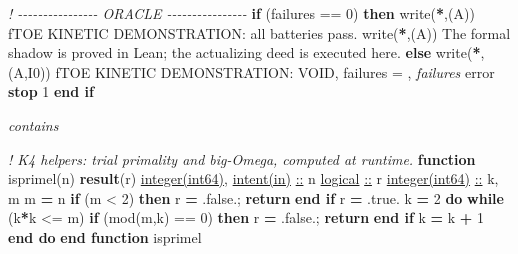 \documentclass[10pt]{article}
\renewcommand{\_}{\origunderscore\allowbreak}
\newenvironment{Shaded}{}{}
\newcommand{\BuiltInTok}[1]{#1}
\newcommand{\CommentTok}[1]{\textit{#1}}
\newcommand{\ConstantTok}[1]{#1}
\newcommand{\DataTypeTok}[1]{\underline{#1}}
\newcommand{\DecValTok}[1]{#1}
\newcommand{\KeywordTok}[1]{\textbf{#1}}
\newcommand{\NormalTok}[1]{#1}
\newcommand{\OperatorTok}[1]{#1}
\newcommand{\StringTok}[1]{#1}
\begin{document}
\begin{Shaded}
\begin{Highlighting}[]
  \CommentTok{! {-}{-}{-}{-}{-}{-}{-}{-}{-}{-}{-}{-}{-}{-}{-}{-} ORACLE {-}{-}{-}{-}{-}{-}{-}{-}{-}{-}{-}{-}{-}{-}{-}{-}}
  \KeywordTok{if}\NormalTok{ (failures }\OperatorTok{==} \DecValTok{0}\NormalTok{) }\KeywordTok{then}
\BuiltInTok{     w}\NormalTok{rite(}\KeywordTok{*}\NormalTok{,}\StringTok{\textquotesingle{}(A)\textquotesingle{}}\NormalTok{) }\StringTok{\textquotesingle{}fTOE KINETIC DEMONSTRATION: all batteries pass.\textquotesingle{}}
\BuiltInTok{     w}\NormalTok{rite(}\KeywordTok{*}\NormalTok{,}\StringTok{\textquotesingle{}(A)\textquotesingle{}}\NormalTok{) }\StringTok{\textquotesingle{}The formal shadow is proved in Lean; the actualizing deed is executed here.\textquotesingle{}}
  \KeywordTok{else}
\BuiltInTok{     w}\NormalTok{rite(}\KeywordTok{*}\NormalTok{,}\StringTok{\textquotesingle{}(A,I0)\textquotesingle{}}\NormalTok{) }\StringTok{\textquotesingle{}fTOE KINETIC DEMONSTRATION: VOID, failures = \textquotesingle{}}\NormalTok{, }\CommentTok{failures}
\BuiltInTok{     e}\NormalTok{rror }\KeywordTok{stop} \DecValTok{1}
  \KeywordTok{end if}

\CommentTok{contains}

  \CommentTok{! K4 helpers: trial primality and big{-}Omega, computed at runtime.}
  \KeywordTok{function}\NormalTok{ isprime\_l(n) }\KeywordTok{result}\NormalTok{(r)}
    \DataTypeTok{integer(int64)}\NormalTok{, }\DataTypeTok{intent(in)} \DataTypeTok{::}\NormalTok{ n}
    \DataTypeTok{logical} \DataTypeTok{::}\NormalTok{ r}
    \DataTypeTok{integer(int64)} \DataTypeTok{::}\NormalTok{ k, m}
\NormalTok{    m }\KeywordTok{=}\NormalTok{ n}
    \KeywordTok{if}\NormalTok{ (m }\OperatorTok{\textless{}} \DecValTok{2}\NormalTok{) }\KeywordTok{then}
\NormalTok{       r }\KeywordTok{=} \ConstantTok{.false.}\NormalTok{; }\KeywordTok{return}
    \KeywordTok{end if}
\NormalTok{    r }\KeywordTok{=} \ConstantTok{.true.}
\NormalTok{    k }\KeywordTok{=} \DecValTok{2}
    \KeywordTok{do} \KeywordTok{while}\NormalTok{ (k}\KeywordTok{*}\NormalTok{k }\OperatorTok{\textless{}=}\NormalTok{ m)}
       \KeywordTok{if}\NormalTok{ (}\BuiltInTok{mod}\NormalTok{(m,k) }\OperatorTok{==} \DecValTok{0}\NormalTok{) }\KeywordTok{then}
\NormalTok{          r }\KeywordTok{=} \ConstantTok{.false.}\NormalTok{; }\KeywordTok{return}
       \KeywordTok{end if}
\NormalTok{       k }\KeywordTok{=}\NormalTok{ k }\KeywordTok{+} \DecValTok{1}
    \KeywordTok{end do}
  \KeywordTok{end function}\NormalTok{ isprime\_l}


\end{Highlighting}
\end{Shaded}
\end{document}
